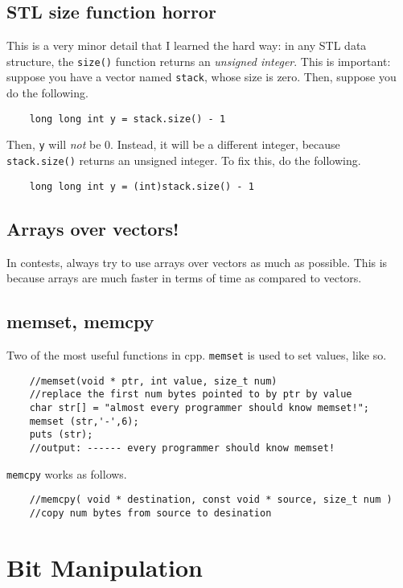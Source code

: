 \documentclass[12pt,a4paper]{amsart}
\numberwithin{equation}{section}
\theoremstyle{definition}
\begin{document}
\subsection{STL size function horror} This is a very minor detail that I learned the hard way: in any STL data structure, the \verb|size()| function returns an \textit{unsigned integer}. This is important: suppose you have a vector named \verb|stack|, whose size is zero. Then, suppose you do the following. 
\begin{verbatim}
    long long int y = stack.size() - 1
\end{verbatim}
Then, \verb|y| will \textit{not} be 0. Instead, it will be a different integer, because \verb|stack.size()| returns an unsigned integer. To fix this, do the following. 
\begin{verbatim}
    long long int y = (int)stack.size() - 1
\end{verbatim}

\subsection{Arrays over vectors!} In contests, always try to use arrays over vectors as much as possible. This is because arrays are much faster in terms of time as compared to vectors. 

\subsection{memset, memcpy} Two of the most useful functions in cpp. \verb|memset| is used to set values, like so. 
\begin{lstlisting}
    //memset(void * ptr, int value, size_t num)
    //replace the first num bytes pointed to by ptr by value 
    char str[] = "almost every programmer should know memset!";
    memset (str,'-',6);
    puts (str);
    //output: ------ every programmer should know memset!
\end{lstlisting}

\verb|memcpy| works as follows. 

\begin{lstlisting}
    //memcpy( void * destination, const void * source, size_t num )
    //copy num bytes from source to desination
\end{lstlisting}

\section{Bit Manipulation}
\end{document}
